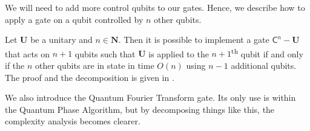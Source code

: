\documentclass[11pt, a4paper]{article}
\begin{document}
                We will need to add more control qubits to our gates. Hence, we describe how to apply a gate on a qubit controlled by \(n\) other qubits.
                
                \begin{definition}
                    Let \(\mathbf{U}\) be a unitary and \(n\in\mathbf{N}\). Then it is possible to implement a gate \(\mathsf{C}^n-\mathbf{U}\) that acts on \(n+1\) qubits such that \(\mathbf{U}\) is applied to the \(n+1\)\textsuperscript{th} qubit if and only if the \(n\) other qubits are in state  in time \(O(n)\) using \(n-1\) additional qubits. The proof and the decomposition is given in \cite{Berta}.
                \end{definition}
                
                We also introduce the Quantum Fourier Transform gate. Its only use is within the Quantum Phase Algorithm, but by decomposing things like this, the complexity analysis becomes clearer.
\end{document}
